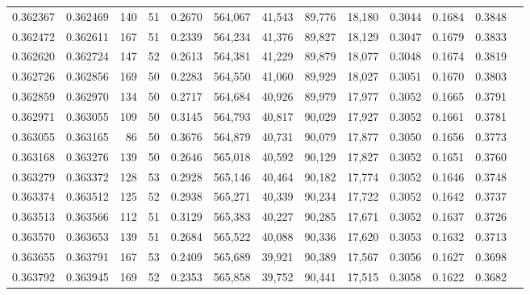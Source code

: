 \begin{tabular}{rrrrrrrrrrrrr}
0.362367 & 0.362469 &   140 &  51 &                                     0.2670 & 564,067 &  41,543 &  89,776 &  18,180 & 0.3044 & 0.1684 & 0.3848 \\
0.362472 & 0.362611 &   167 &  51 &                                     0.2339 & 564,234 &  41,376 &  89,827 &  18,129 & 0.3047 & 0.1679 & 0.3833 \\
0.362620 & 0.362724 &   147 &  52 &                                     0.2613 & 564,381 &  41,229 &  89,879 &  18,077 & 0.3048 & 0.1674 & 0.3819 \\
0.362726 & 0.362856 &   169 &  50 &                                     0.2283 & 564,550 &  41,060 &  89,929 &  18,027 & 0.3051 & 0.1670 & 0.3803 \\
0.362859 & 0.362970 &   134 &  50 &                                     0.2717 & 564,684 &  40,926 &  89,979 &  17,977 & 0.3052 & 0.1665 & 0.3791 \\
0.362971 & 0.363055 &   109 &  50 &                                     0.3145 & 564,793 &  40,817 &  90,029 &  17,927 & 0.3052 & 0.1661 & 0.3781 \\
0.363055 & 0.363165 &    86 &  50 &                                     0.3676 & 564,879 &  40,731 &  90,079 &  17,877 & 0.3050 & 0.1656 & 0.3773 \\
0.363168 & 0.363276 &   139 &  50 &                                     0.2646 & 565,018 &  40,592 &  90,129 &  17,827 & 0.3052 & 0.1651 & 0.3760 \\
0.363279 & 0.363372 &   128 &  53 &                                     0.2928 & 565,146 &  40,464 &  90,182 &  17,774 & 0.3052 & 0.1646 & 0.3748 \\
0.363374 & 0.363512 &   125 &  52 &                                     0.2938 & 565,271 &  40,339 &  90,234 &  17,722 & 0.3052 & 0.1642 & 0.3737 \\
0.363513 & 0.363566 &   112 &  51 &                                     0.3129 & 565,383 &  40,227 &  90,285 &  17,671 & 0.3052 & 0.1637 & 0.3726 \\
0.363570 & 0.363653 &   139 &  51 &                                     0.2684 & 565,522 &  40,088 &  90,336 &  17,620 & 0.3053 & 0.1632 & 0.3713 \\
0.363655 & 0.363791 &   167 &  53 &                                     0.2409 & 565,689 &  39,921 &  90,389 &  17,567 & 0.3056 & 0.1627 & 0.3698 \\
0.363792 & 0.363945 &   169 &  52 &                                     0.2353 & 565,858 &  39,752 &  90,441 &  17,515 & 0.3058 & 0.1622 & 0.3682 \\

\end{tabular}
